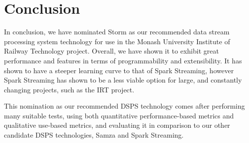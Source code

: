 \section{Conclusion} %
\label{sub:evaluation_conclusion}

In conclusion, we have nominated Storm as our recommended data stream processing system technology for use in the Monash
University Institute of Railway Technology project. Overall, we have shown it to exhibit great performance and features
in terms of programmability and extensibility. It has shown to have a steeper learning curve to that of Spark Streaming,
however Spark Streaming has shown to be a less viable option for large, and constantly changing projects, such as the IRT
project.

This nomination as our recommended DSPS technology comes after performing many suitable tests, using both quantitative performance-based
metrics and qualitative use-based metrics, and evaluating it in comparison to our other candidate DSPS technologies, Samza and Spark Streaming.


